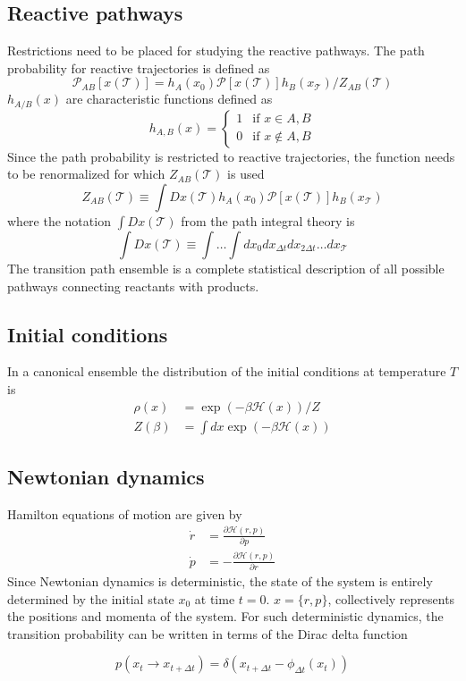 \documentclass{article}
\begin{document}
\subsection{Reactive pathways}
Restrictions need to be placed for studying the reactive pathways. The path probability for 
reactive trajectories is defined as
\begin{equation}
\mathcal{P}_{AB}[x(\mathcal{T})]= h_A(x_0)\mathcal{P}[x(\mathcal{T})]h_B(x_{\mathcal{T}})/Z_{AB}(\mathcal{T})
\end{equation}
$h_{A/B}(x)$ are characteristic functions defined as
\[
 h_{A,B}(x) = 
  \begin{cases} 
   1 & \text{if } x \in A,B \\
   0 & \text{if } x \not\in A,B
  \end{cases}
\]
Since the path probability is restricted to reactive trajectories, the 
function needs to be renormalized for which $Z_{AB}(\mathcal{T})$ is used
\begin{equation}
Z_{AB}(\mathcal{T}) \equiv \int Dx(\mathcal{T})h_A(x_0)\mathcal{P}[x(\mathcal{T})]
h_B(x_{\mathcal{T}})
\end{equation}
where the notation $\int Dx(\mathcal{T})$ from the path integral theory is 
\begin{equation}
\int Dx(\mathcal{T}) \equiv \int\ldots\int dx_0dx_{\Delta t}dx_{2\Delta t}\ldots dx_{\mathcal{T}}
\end{equation}
The transition path ensemble is a complete statistical description of all possible pathways connecting reactants with products. 
\subsection{Initial conditions}
In a canonical ensemble the distribution of the initial conditions
at temperature $T$ is 
\begin{align}
\rho(x) &= \exp(-\beta\mathcal{H}(x))/Z \\
Z(\beta) &= \int dx\exp(-\beta\mathcal{H}(x))
\end{align} 
\subsection{Newtonian dynamics}
Hamilton equations of motion are given by
\begin{align}
\dot{r} &=\frac{\partial \mathcal{H}(r,p)}{\partial p} \\
\dot{p} &=-\frac{\partial\mathcal{H}(r,p)}{\partial r}
\end{align}
Since Newtonian dynamics is deterministic, the state of the system is entirely
determined by the initial state $x_0$ at time $t=0$. 
$x=\{r,p\}$, collectively represents the positions and momenta of the system. 
For such deterministic dynamics, the transition probability can be written in terms of the Dirac delta function

\begin{equation}
p(x_t\rightarrow x_{t+\Delta t}) = \delta(x_{t+\Delta t}-\phi_{\Delta t}(x_t))
\end{equation}
\end{document}
